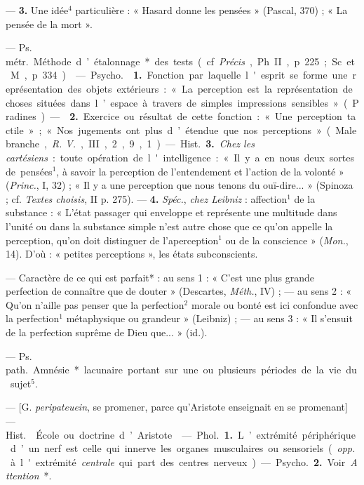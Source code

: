 \begin{itemize}[leftmargin=1cm, label=, itemsep=1pt]
—  {\bf 3.} Une idée$^4$ particulière : « Hasard donne les
pensées » (Pascal, 370) ; « La pensée de la mort ».

 — \si{Ps. métr.} Méthode d’étalonnage* des tests (cf.
{\it Précis}, Ph. II, p. 225; Sc. et M., p. 334).

 — \si{Psycho.}  {\bf 1.} Fonction par laquelle
l'esprit se forme une représentation des objets extérieurs : « La perception
est la représentation de choses situées dans l’espace à travers de simples
impressions sensibles » (Pradines). —  {\bf 2.} Exercice ou
résultat de cette fonction : « Une perception tactile »; « Nos jugements
ont plus d’étendue que nos perceptions » (Malebranche, {\it R. V.}, III, 2,
9, 1).

— \si{Hist.} {\bf 3.} {\it Chez les cartésiens} : toute opération de
l'intelligence : « Il y a en nous deux sortes de pensées$^1$, à savoir la
perception de l’entendement et l’action de la volonté » ({\it Princ.}, I,
32) ; « Il y a une perception que nous tenons du ouï-dire... » (Spinoza ; cf.
{\it Textes choisis}, II p. 275). — {\bf 4.} {\it Spéc.}, {\it chez Leibniz} :
affection$^1$ de la substance : « L'état passager qui enveloppe et représente
une multitude dans l’unité ou dans la substance simple n’est autre chose que
ce qu’on appelle la perception, qu’on doit distinguer de l’aperception$^1$ ou
de la conscience » ({\it Mon.}, 14). D'où : « petites perceptions », les
états subconscients.

 — Caractère de ce qui est parfait* : au sens 1 : « C’est une
plus grande perfection de connaître que de douter » (Descartes, {\it Méth.},
IV) ; — au sens 2 : « Qu'on n'aille pas penser que la perfection$^2$ morale
ou bonté est ici confondue avec la perfection$^1$ métaphysique ou grandeur
» (Leibniz) ; — au sens 3 : « Il s'ensuit de la perfection suprême de Dieu
que... » (id.).

 — \si{Ps. path.} Amnésie* lacunaire portant sur une
ou plusieurs périodes de la vie du sujet$^5$.

 — [G. {\it peripateuein}, se promener, parce qu’Aristote
enseignait en se promenant] — \si{Hist.}  École ou doctrine
d’Aristote.

 — \si{Phol.} {\bf 1.} L’extrémité périphérique d’un nerf
est celle qui innerve les organes musculaires ou sensoriels ({\it opp.} à
l'extrémité {\it centrale} qui part des centres nerveux). — \si{Psycho.}
{\bf 2.} Voir {\it Attention}*.


\end{itemize}
